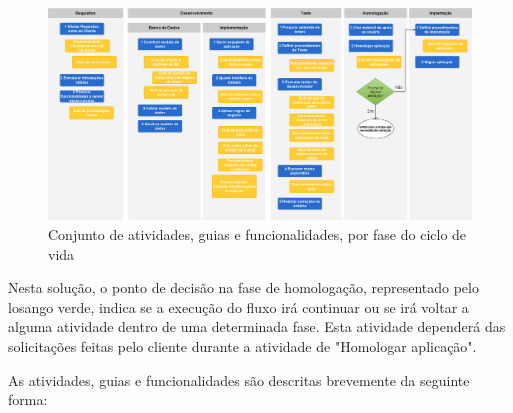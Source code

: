 \begin{landscape}
\vspace*{\fill}
\begin{figure}[!htb]
	\centering
		\includegraphics[scale=0.4]{figuras/fluxograma_solucao}
	\caption{Conjunto de atividades, guias e funcionalidades, por fase do ciclo de vida}
\end{figure}
\end{landscape}

Nesta solução, o ponto de decisão na fase de homologação, representado pelo losango verde, indica se a execução do fluxo irá continuar ou se irá voltar a alguma atividade dentro de uma determinada fase. Esta atividade dependerá das solicitações feitas pelo cliente durante a atividade de "Homologar aplicação".

As atividades, guias e funcionalidades são descritas brevemente da seguinte forma:

